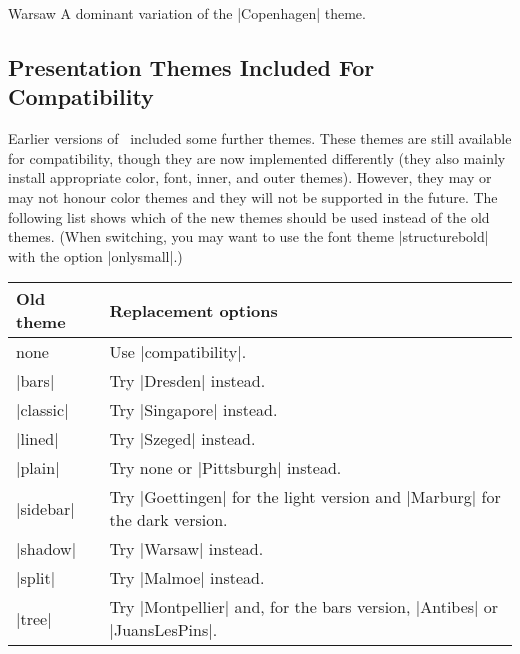 \begin{themeexample}{Warsaw}
  A dominant variation of the |Copenhagen| theme.
\end{themeexample}


\subsection{Presentation Themes Included For Compatibility}

Earlier versions of \beamer\ included some further themes. These
themes are still available for compatibility, though they are now
implemented differently (they also mainly install appropriate color,
font, inner, and outer themes). However, they may or may not honour
color themes and they will not be supported in the future. The
following list shows which of the new themes should be used instead of
the old themes. (When switching, you may want to use the font theme
|structurebold| with the option |onlysmall|.)

\medskip
\begin{tabular}{lp{13cm}}
  Old theme & Replacement options \\\hline
  none & Use |compatibility|. \\
  |bars| & Try |Dresden| instead. \\
  |classic| & Try |Singapore| instead. \\
  |lined| & Try |Szeged| instead. \\
  |plain| & Try none or |Pittsburgh| instead. \\
  |sidebar| & Try |Goettingen| for the light version and |Marburg| for
  the dark version. \\
  |shadow| & Try |Warsaw| instead. \\
  |split| & Try |Malmoe| instead. \\
  |tree| & Try |Montpellier| and, for the bars version, |Antibes| or
  |JuansLesPins|. 
\end{tabular}


